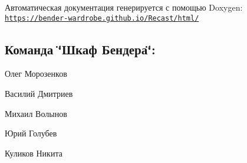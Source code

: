 Автоматическая документация генерируется с помощью Doxygen\-: \href{https://bender-wardrobe.github.io/Recast/html/}{\tt https\-://bender-\/wardrobe.\-github.\-io/\-Recast/html/}

\subsection*{Команда \char`\"{}Шкаф Бендера\char`\"{}\-:}


\begin{DoxyItemize}
\item Олег Морозенков
\item Василий Дмитриев
\item Михаил Волынов
\item Юрий Голубев
\item Куликов Никита 
\end{DoxyItemize}